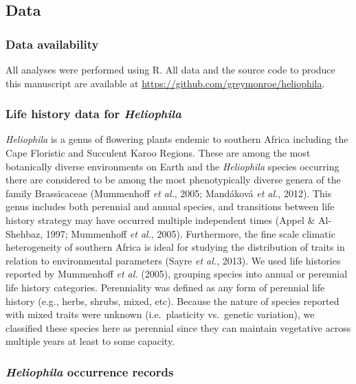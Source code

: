 \documentclass[man,floatsintext]{apa6}
\theoremstyle{definition}
\theoremstyle{definition}
\theoremstyle{definition}
\theoremstyle{remark}
\begin{document}
\hypertarget{data}{%
\subsection{Data}\label{data}}

\hypertarget{data-availability}{%
\subsubsection{Data availability}\label{data-availability}}

All analyses were performed using R. All data and the source code to
produce this manuscript are available at
\url{https://github.com/greymonroe/heliophila}.

\hypertarget{life-history-data-for-heliophila}{%
\subsubsection{\texorpdfstring{Life history data for
\emph{Heliophila}}{Life history data for Heliophila}}\label{life-history-data-for-heliophila}}

\emph{Heliophila} is a genus of flowering plants endemic to southern
Africa including the Cape Floristic and Succulent Karoo Regions. These
are among the most botanically diverse environments on Earth and the
\emph{Heliophila} species occurring there are considered to be among the
most phenotypically diverse genera of the family Brassicaceae
(Mummenhoff \emph{et al.}, 2005; Mandáková \emph{et al.}, 2012). This
genus includes both perennial and annual species, and transitions
between life history strategy may have occurred multiple independent
times (Appel \& Al-Shehbaz, 1997; Mummenhoff \emph{et al.}, 2005).
Furthermore, the fine scale climatic heterogeneity of southern Africa is
ideal for studying the distribution of traits in relation to
environmental parameters (Sayre \emph{et al.}, 2013). We used life
histories reported by Mummenhoff \emph{et al.} (2005), grouping species
into annual or perennial life history categories. Perenniality was
defined as any form of perennial life history (e.g., herbs, shrubs,
mixed, etc). Because the nature of species reported with mixed traits
were unknown (i.e.~plasticity vs.~genetic variation), we classified
these species here as perennial since they can maintain vegetative
across multiple years at least to some capacity.

\hypertarget{heliophila-occurrence-records}{%
\subsubsection{\texorpdfstring{\emph{Heliophila} occurrence
records}{Heliophila occurrence records}}\label{heliophila-occurrence-records}}
\end{document}
